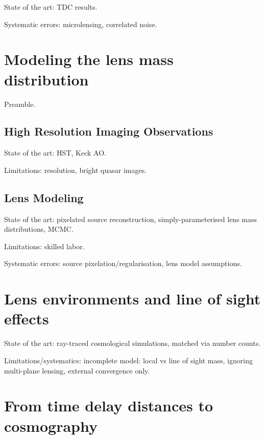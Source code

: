 State of the art: TDC results.

Systematic errors: microlensing, correlated noise.



\section{Modeling the lens mass distribution}
\label{sec:lensmodel}

Preamble.


\subsection{High Resolution Imaging Observations}

State of the art: HST, Keck AO.

Limitations: resolution, bright quasar images.



\subsection{Lens Modeling}

State of the art: pixelated source reconstruction,
simply-parameterised lens mass distributions, MCMC.

Limitations: skilled labor.

Systematic errors: source pixelation/regularisation, lens model
assumptions.



\section{Lens environments and line of sight effects}
\label{sec:los}

State of the art: ray-traced cosmological simulations, matched via
number counts.

Limitations/systematics: incomplete model: local vs line of sight
mass,  ignoring multi-plane lensing, external convergence only.



\section{From time delay distances to cosmography}
\label{sec:cosmo}

